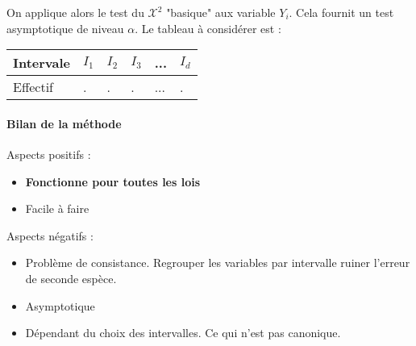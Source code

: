 \documentclass{article}
\theoremstyle{plain}%
\theoremstyle{definition}
\theoremstyle{remark}
\begin{document}
On applique alors le test du $ \mathcal{X}^2 $ "basique" aux variable $ Y_i $. Cela fournit un test asymptotique de niveau $ \alpha  $. Le tableau à considérer est : 
\begin{table}[!ht]
    \centering
    \begin{tabular}{|l|l|l|l|l|l|}
    \hline
        Intervale & $I_1$ & $I_2$ & $I_3$ & ... & $I_d$ \\ \hline
        Effectif & . & . & . & ... & . \\ \hline
    \end{tabular}
\end{table}

\paragraph{Bilan de la méthode}
Aspects positifs : 
\begin{itemize}
    \item \textbf{Fonctionne pour toutes les lois}
    \item Facile à faire
\end{itemize}

Aspects négatifs : 
\begin{itemize}
    \item Problème de consistance. Regrouper les variables par intervalle ruiner l'erreur de seconde espèce.
    \item Asymptotique
    \item Dépendant du choix des intervalles. Ce qui n'est pas canonique.
\end{itemize}
\end{document}

